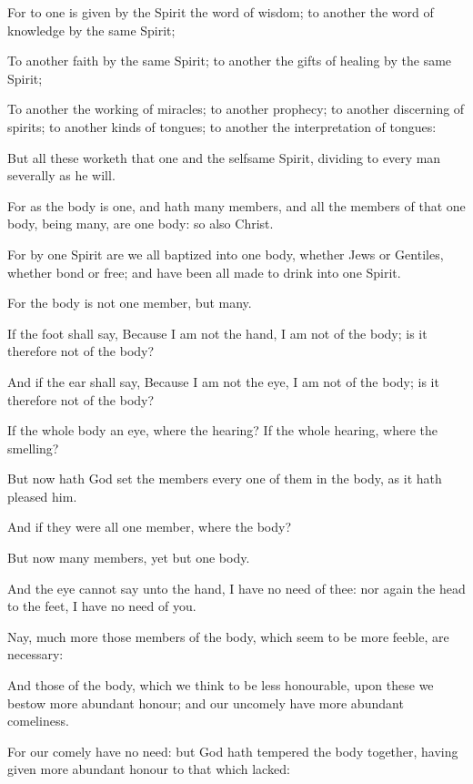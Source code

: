 {For to
one is
given
by the
Spirit the
word of
wisdom; to
another the
word of
knowledge
by the
same
Spirit;

To
another
faith
by the
same
Spirit;
to
another the
gifts of
healing
by the
same
Spirit;

To
another the
working of
miracles;
to
another
prophecy;
to
another
discerning of
spirits;
to
another
{}
kinds of
tongues;
to
another the
interpretation of
tongues:

But
all
these
worketh that
one
and the
selfsame
Spirit,
dividing to every
man
severally
as he
will.

For
as the
body
is
one,
and
hath
many
members,
and
all the
members of that
one
body,
being
many,
are
one
body:
so
also
{}
Christ.

For
by
one
Spirit
are
we
all
baptized
into
one
body,
whether
{}
Jews
or
Gentiles,
whether
{}
bond
or
free;
and have
been
all made to
drink
into
one
Spirit.

For the
body
is
not
one
member,
but
many.

If the
foot shall
say,
Because I
am
not the
hand, I
am
not
of the
body;
is
it
therefore
not
of the
body?

And
if the
ear shall
say,
Because I
am
not the
eye, I
am
not
of the
body;
is
it
therefore
not
of the
body?

If the
whole
body
{} an
eye,
where
{} the
hearing?
If the
whole
{}
hearing,
where
{} the
smelling?

But
now
hath
God
set the
members
every
one of
them
in the
body,
as it hath pleased
him.

And
if they
were
all
one
member,
where
{} the
body?

But
now
{}
many
members,
yet
but
one
body.

And the
eye
cannot
say unto the
hand, I
have
no
need of
thee:
nor
again the
head to the
feet, I
have
no
need of
you.

Nay,
much
more those
members of the
body,
which
seem to
be more
feeble,
are
necessary:

And
those
{} of the
body,
which we
think to
be less
honourable, upon
these we
bestow more
abundant
honour;
and
our
uncomely
{}
have more
abundant
comeliness.

For
our
comely
{}
have
no
need:
but
God hath
tempered the
body
together, having
given more
abundant
honour to
that
{} which
lacked:

}
